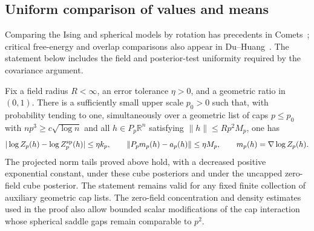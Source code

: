 \subsection{Uniform comparison of values and means}
Comparing the Ising and spherical models by rotation has precedents in
Comets~\cite{Comets1996Spherical}; critical free-energy and overlap
comparisons also appear in Du--Huang~\cite{DuHuang2026CriticalFluctuations,
DuHuang2026CriticalOverlap}. The statement below includes the field and
posterior-test uniformity required by the covariance argument.
\begin{proposition}\label{cap:static-comparison}
Fix a field radius $R<\infty$, an error tolerance $\eta>0$, and a geometric
ratio in $(0,1)$. There is a sufficiently small upper scale $p_0>0$ such that,
with probability tending to one, simultaneously over a geometric list of caps
$p\le p_0$ with $np^3\ge c\sqrt{\log n}$ and all
$h\in P_p\mathbb R^n$ satisfying $\|h\|\le R p^2 M_p$, one has
\begin{equation}\label{cap:static-values}
 |\log Z_p(h)-\log Z_p^{\rm sp}(h)|\le \eta k_p,\qquad
 \|P_p m_p(h)-a_p(h)\|\le \eta M_p,
 \qquad m_p(h)=\nabla\log Z_p(h).
\end{equation}
The projected norm tails proved above hold, with a decreased positive
exponential constant, under these cube posteriors and under the uncapped
zero-field cube posterior. The statement remains valid for any fixed finite collection of auxiliary
geometric cap lists. The zero-field concentration and density estimates
used in the proof also allow bounded scalar modifications of the cap
interaction whose spherical saddle gaps remain comparable to $p^2$.
\end{proposition}
